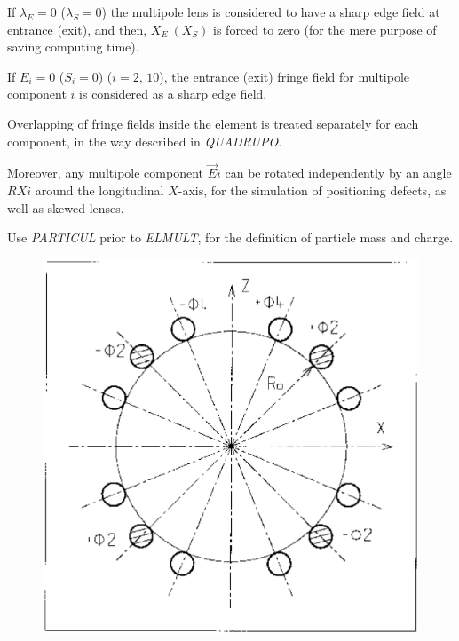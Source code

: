 \noindent If $ \lambda_ E=0 $  ($\lambda_ S=0$)  the multipole lens is
considered to have a sharp edge field at entrance (exit), and then, 
$ X_E \ (X_S) $ is forced to zero (for the mere purpose of saving computing time).  
\bigskip

\noindent If $ E_i=0 $  ($S_i=0$) ($i=2,\, 10$), the entrance (exit) fringe field for
multipole component $ i $ is considered as a sharp edge field.  
\bigskip

\noindent Overlapping of fringe fields inside the element is treated
separately for each component, in the way described in \textsl{QUADRUPO}. 

\noindent Moreover, any multipole component $ \vec  Ei $ can be rotated
independently by an angle $ RXi $ around the longitudinal $ X$-axis, for the simulation of 
positioning defects, as well as skewed lenses. 

\noindent Use \textsl{PARTICUL} prior to \textsl{ELMULT}, for the
 definition of particle mass and charge.

\vfill

\begin{figure}[H]
\centerline{\includegraphics[width=14cm]{Fig21.ps}}
{\setlength{\captionwidth}{10cm}
}\end{figure}
\vfill










